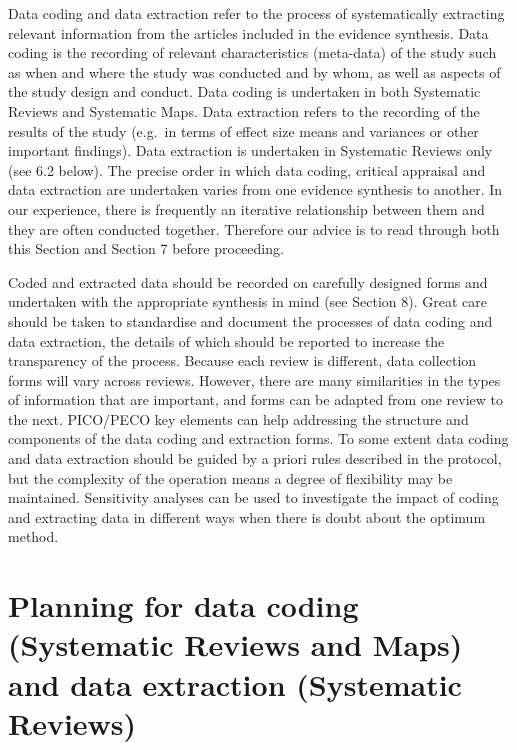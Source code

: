 \documentclass[
  letterpaper,
  DIV=11,
  numbers=noendperiod]{scrreprt}
\begin{document}
Data coding and data extraction refer to the process of systematically
extracting relevant information from the articles included in the
evidence synthesis. Data coding is the recording of relevant
characteristics (meta-data) of the study such as when and where the
study was conducted and by whom, as well as aspects of the study design
and conduct. Data coding is undertaken in both Systematic Reviews and
Systematic Maps. Data extraction refers to the recording of the results
of the study (e.g.~in terms of effect size means and variances or other
important findings). Data extraction is undertaken in Systematic Reviews
only (see 6.2 below). The precise order in which data coding, critical
appraisal and data extraction are undertaken varies from one evidence
synthesis to another. In our experience, there is frequently an
iterative relationship between them and they are often conducted
together. Therefore our advice is to read through both this Section and
Section 7 before proceeding.

Coded and extracted data should be recorded on carefully designed forms
and undertaken with the appropriate synthesis in mind (see Section 8).
Great care should be taken to standardise and document the processes of
data coding and data extraction, the details of which should be reported
to increase the transparency of the process. Because each review is
different, data collection forms will vary across reviews. However,
there are many similarities in the types of information that are
important, and forms can be adapted from one review to the next.
PICO/PECO key elements can help addressing the structure and components
of the data coding and extraction forms. To some extent data coding and
data extraction should be guided by a priori rules described in the
protocol, but the complexity of the operation means a degree of
flexibility may be maintained. Sensitivity analyses can be used to
investigate the impact of coding and extracting data in different ways
when there is doubt about the optimum method.

\section{Planning for data coding (Systematic Reviews and Maps) and data
extraction (Systematic
Reviews)}\label{planning-for-data-coding-systematic-reviews-and-maps-and-data-extraction-systematic-reviews}
\end{document}
